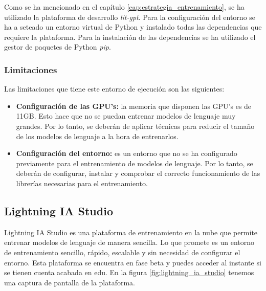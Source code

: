 Como se ha mencionado en el capítulo \ref{cap:estrategia_entrenamiento}, se ha utilizado
la plataforma de desarrollo \textit{lit-gpt}. Para la configuración del entorno se ha
a seteado un entorno virtual de Python y instalado todas las dependencias que requiere
la plataforma. Para la instalación de las dependencias se ha utilizado el gestor de paquetes
de Python \textit{pip}.

\subsubsection{Limitaciones}
\label{subsubsec:limitaciones}


Las limitaciones que tiene este entorno de ejecución son las siguientes:

\begin{itemize}
    \item \textbf{Configuración de las GPU's:} la memoria que disponen las GPU's es de 11GB.
        Esto hace que no se puedan entrenar modelos de lenguaje muy grandes. Por lo tanto,
        se deberán de aplicar técnicas para reducir el tamaño de los modelos de lenguaje a la
        hora de entrenarlos.
    \item \textbf{Configuración del entorno:} es un entorno que no se ha configurado previamente
        para el entrenamiento de modelos de lenguaje. Por lo tanto, se deberán de configurar, instalar
        y comprobar el correcto funcionamiento de las librerías necesarias para el entrenamiento.
\end{itemize}

\subsection{Lightning IA Studio}
\label{subsec:lightning_ia_studio}


Lightning IA Studio es una plataforma de entrenamiento en la nube que permite entrenar
modelos de lenguaje de manera sencilla. Lo que promete es un entorno de entrenamiento
sencillo, rápido, escalable y sin necesidad de configurar el entorno. Esta plataforma
se encuentra en fase beta y puedes acceder al instante si se tienen cuenta acabada en
edu. En la figura \ref{fig:lightning_ia_studio} tenemos una captura de pantalla de la
plataforma.

